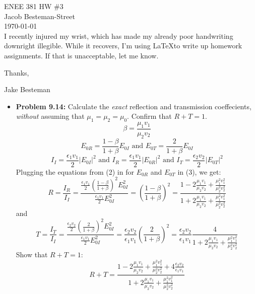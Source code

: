 \documentclass{report}
\begin{document}
ENEE 381 HW \#3 \\
Jacob Besteman-Street \\
\today \\
I recently injured my wrist, which has made my already poor handwriting downright illegible.
While it recovers, I'm using \LaTeX to write up homework assignments. If that is unacceptable, let me know.

Thanks,

Jake Besteman

\begin{itemize}
  \item \textbf{Problem 9.14:} Calculate the \textit{exact} reflection and transmission coeffecients, \textit{without}
  assuming that $\mu_1 = \mu_2 = \mu_0$. Confirm that $R+T=1$. \\
  \newline
  \begin{equation}
    \label{beta}
    \beta = \frac{\mu_1v_1}{\mu_2v_2}
  \end{equation}
  \begin{equation}
    E_{0R}= \frac{1-\beta}{1+\beta}E_{0I} \text{ and } E_{0T}= \frac{2}{1+\beta}E_{0I}
  \end{equation}
  \begin{equation}
  I_I = \frac{\epsilon_1v_1}{2}|E_{0I}|^2 \text{ and }I_R = \frac{\epsilon_1v_1}{2}|E_{0R}|^2\text{ and }I_T = \frac{\epsilon_2v_2}{2}|E_{0T}|^2
  \end{equation}
Plugging the equations from (2) in for $E_{0R}$ and $E_{0T}$ in (3), we get:
\begin{equation}
R = \frac{I_R}{I_I}  = \frac{\frac{\epsilon_1v_1}{2}(\frac{1-\beta}{1+\beta})^2E_{0I}^2}{\frac{\epsilon_1v_1}{2}E_{0I}^2} = (\frac{1-\beta}{1+\beta})^2 = \frac{1-2\frac{\mu_1v_1}{\mu_2v_2}+\frac{\mu_1^2v_1^2}{\mu_2^2v_2^2}}{1+2\frac{\mu_1v_1}{\mu_2v_2}+\frac{\mu_1^2v_1^2}{\mu_2^2v_2^2}}
\end{equation}
and
\begin{equation}
T = \frac{I_T}{I_I}  = \frac{\frac{\epsilon_2v_2}{2}(\frac{2}{1+\beta})^2E_{0I}^2}{\frac{\epsilon_1v_1}{2}E_{0I}^2} = \frac{\epsilon_2v_2}{\epsilon_1v_1}(\frac{2}{1+\beta})^2 =\frac{\epsilon_2v_2}{\epsilon_1v_1} \frac{4}{1+2\frac{\mu_1v_1}{\mu_2v_2}+\frac{\mu_1^2v_1^2}{\mu_2^2v_2^2}}
\end{equation}
Show that $R+T=1$:
\begin{equation}
  R+T=\frac{1-2\frac{\mu_1v_1}{\mu_2v_2}+\frac{\mu_1^2v_1^2}{\mu_2^2v_2^2}+4\frac{\epsilon_2v_2}{\epsilon_1v_1}}{1+2\frac{\mu_1v_1}{\mu_2v_2}+\frac{\mu_1^2v_1^2}{\mu_2^2v_2^2}}

\end{equation}
\end{itemize}
\end{document}
